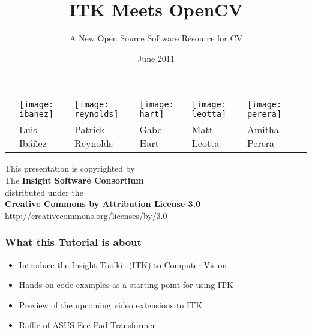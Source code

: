 \documentclass[handout,18pt]{beamer}
\begin{document}
\title[ITK - OpenCV]{ITK Meets OpenCV}
\subtitle[ITK-OpenCV]{A New Open Source Software Resource for CV}
\date[June 2011]{June 2011}

\begin{frame}
\titlepage
\begin{tabular}{cp{}p{}p{}p{}p{}c}
&
\centering\texttt{[image: ibanez]} &
\centering\texttt{[image: reynolds]} &
\centering\texttt{[image: hart]} &
\centering\texttt{[image: leotta]} &
\centering\texttt{[image: perera]} & \\
&
\centering{}Luis Ib\'a\~nez &
\centering{}Patrick Reynolds &
\centering{}Gabe Hart &
\centering{}Matt Leotta &
\centering{}Amitha Perera & \\
\end{tabular}
\end{frame}


{
\begin{frame}[plain]
\center
\begin{center}
This presentation is copyrighted by\\
The \textbf{Insight Software Consortium}\\
\bigskip
distributed under the\\
\textbf{Creative Commons by Attribution License 3.0}\\
\url{http://creativecommons.org/licenses/by/3.0}\\
\end{center}
\end{frame}
}


\begin{frame}
  \tableofcontents
\end{frame}


\begin{frame}
\frametitle{What this Tutorial is about}
\begin{itemize}
\item Introduce the Insight Toolkit (ITK) to Computer Vision
\item Hands-on code examples as a starting point for using ITK
\item Preview of the upcoming video extensions to ITK
\item Raffle of ASUS Eee Pad Transformer
\end{itemize}
\end{frame}
\end{document}
